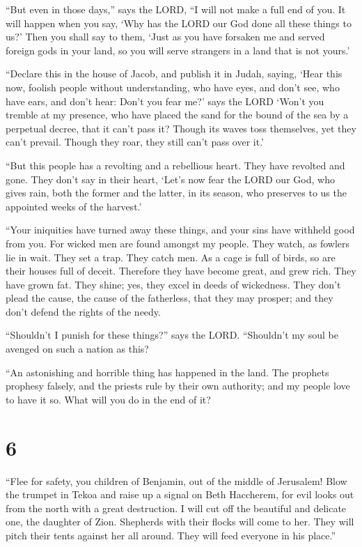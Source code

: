  ``But even in those days,'' says the LORD, ``I will not
make a full end of you.  It will happen when you say, `Why
has the LORD our God done all these things to us?' Then you shall say to
them, `Just as you have forsaken me and served foreign gods in your
land, so you will serve strangers in a land that is not yours.'

 ``Declare this in the house of Jacob, and publish it in
Judah, saying,  `Hear this now, foolish people without
understanding, who have eyes, and don't see, who have ears, and don't
hear:  Don't you fear me?' says the LORD `Won't you tremble
at my presence, who have placed the sand for the bound of the sea by a
perpetual decree, that it can't pass it? Though its waves toss
themselves, yet they can't prevail. Though they roar, they still can't
pass over it.'

 ``But this people has a revolting and a rebellious heart.
They have revolted and gone.  They don't say in their
heart, `Let's now fear the LORD our God, who gives rain, both the former
and the latter, in its season, who preserves to us the appointed weeks
of the harvest.'

 ``Your iniquities have turned away these things, and your
sins have withheld good from you.  For wicked men are found
amongst my people. They watch, as fowlers lie in wait. They set a trap.
They catch men.  As a cage is full of birds, so are their
houses full of deceit. Therefore they have become great, and grew rich.
 They have grown fat. They shine; yes, they excel in deeds
of wickedness. They don't plead the cause, the cause of the fatherless,
that they may prosper; and they don't defend the rights of the needy.

 ``Shouldn't I punish for these things?'' says the LORD.
``Shouldn't my soul be avenged on such a nation as this?

 ``An astonishing and horrible thing has happened in the
land.  The prophets prophesy falsely, and the priests rule
by their own authority; and my people love to have it so. What will you
do in the end of it?

\hypertarget{section-5}{%
\section{6}\label{section-5}}

 ``Flee for safety, you children of Benjamin, out of the
middle of Jerusalem! Blow the trumpet in Tekoa and raise up a signal on
Beth Haccherem, for evil looks out from the north with a great
destruction.  I will cut off the beautiful and delicate one,
the daughter of Zion.  Shepherds with their flocks will come
to her. They will pitch their tents against her all around. They will
feed everyone in his place.''


